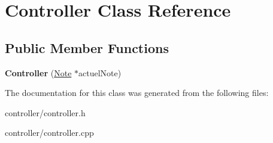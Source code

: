 \hypertarget{class_controller}{\section{Controller Class Reference}
\label{class_controller}
}
\subsection*{Public Member Functions}
\begin{DoxyCompactItemize}
\item 
\hypertarget{class_controller_a1074f51c7331d6ea565f7e714e4bd86b}{{\bfseries Controller} (\hyperlink{class_note}{Note} $\ast$actuel\-Note)}\label{class_controller_a1074f51c7331d6ea565f7e714e4bd86b}

\end{DoxyCompactItemize}


The documentation for this class was generated from the following files\-:\begin{DoxyCompactItemize}
\item 
controller/controller.\-h\item 
controller/controller.\-cpp\end{DoxyCompactItemize}
